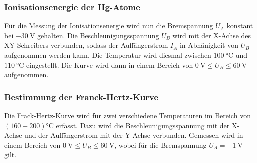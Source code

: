 \subsubsection*{Ionisationsenergie der Hg-Atome}
Für die Messung der Ionisationsenergie wird nun die Bremspannung $U_A$ konstant bei $\SI{-30}{\volt}$ gehalten. Die Beschleunigungsspannung
$U_B$ wird mit der X-Achse des XY-Schreibers verbunden, sodass der Auffängerstrom $I_A$ in Abhänigkeit von $U_B$ aufgenommen werden kann. 
Die Temperatur wird diesmal zwischen $\SI{100}{\celsius}$ und $\SI{110}{\celsius}$ eingestellt. Die Kurve wird dann in einem
Bereich von $\SI{0}{\volt} \leq U_B \leq \SI{60}{\volt}$ aufgenommen. 

\subsubsection*{Bestimmung der Franck-Hertz-Kurve}
Die Frack-Hertz-Kurve wird für zwei verschiedene Temperaturen im Bereich von $(\num{160}-\num{200})\si{\celsius}$ erfasst. Dazu wird die 
Beschleunigungsspannung mit der X-Achse und der Auffängerstrom mit der Y-Achse verbunden. Gemessen wird in einem Bereich von 
$\SI{0}{\volt} \leq U_B \leq \SI{60}{\volt}$, wobei für die Bremspannung $U_A=\SI{-1}{\volt}$ gilt.